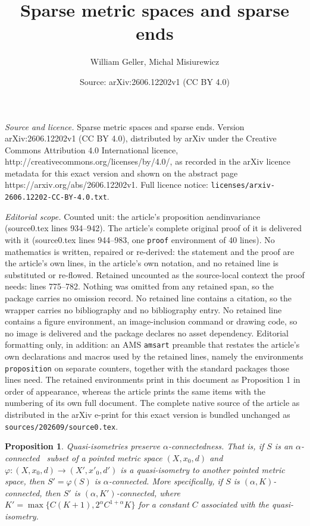 \documentclass[10pt,a4paper]{amsart}
\title{Sparse metric spaces and sparse ends}
\author{William Geller, Michal Misiurewicz}
\date{Source: arXiv:2606.12202v1 (CC BY 4.0)}
\newtheorem{proposition}{Proposition}
\newcommand{\aconn}{$\alpha$-connected}
\newcommand{\akconn}{$(\alpha,K)$-connected}
\newcommand{\akpconn}{$(\alpha,K')$-connected}
\newcommand{\ph}{\varphi}
\begin{document}
\maketitle

\noindent\emph{Source and licence.} Sparse metric spaces and sparse ends. Version arXiv:2606.12202v1 (CC BY 4.0), distributed by arXiv under the Creative Commons Attribution 4.0 International licence, http://creativecommons.org/licenses/by/4.0/, as recorded in the arXiv licence metadata for this exact version and shown on the abstract page https://arxiv.org/abs/2606.12202v1. Full licence notice: \texttt{licenses/arxiv-2606.12202-CC-BY-4.0.txt}.\par\smallskip

\noindent\textit{Editorial scope.} Counted unit: the article's proposition aendinvariance (source0.tex lines 934--942). The article's complete original proof of it is delivered with it (source0.tex lines 944--983, one \texttt{proof} environment of 40 lines). No mathematics is written, repaired or re-derived: the statement and the proof are the article's own lines, in the article's own notation, and no retained line is substituted or re-flowed.  Retained uncounted as the source-local context the proof needs: lines 775--782.  Nothing was omitted from any retained span, so the package carries no omission record.  No retained line contains a citation, so the wrapper carries no bibliography and no bibliography entry.  No retained line contains a figure environment, an image-inclusion command or drawing code, so no image is delivered and the package declares no asset dependency.  Editorial formatting only, in addition: an AMS \texttt{amsart} preamble that restates the article's own declarations and macros used by the retained lines, namely the environments \texttt{proposition} on separate counters, together with the standard packages those lines need.  The retained environments print in this document as Proposition 1 in order of appearance, whereas the article prints the same items with the numbering of its own full document.  The complete native source of the article as distributed in the arXiv e-print for this exact version is bundled unchanged as \texttt{sources/202609/source0.tex}.
\begin{proposition}\label{aconninvariance}
Quasi-isometries preserve \aconn ness. That is, if $S$ is an \aconn
\ subset of a pointed metric space $(X,x_0,d)$ and $\ph: (X,x_0,d) \to
(X',x'_0,d')$ is a quasi-isometry to another pointed metric space,
then $S'=\ph(S)$ is \aconn. More specifically, if $S$ is \akconn, then
$S'$ is \akpconn, where $K'=\max\{C(K+1), 2^\alpha C^{1+\alpha} K\}$
for a constant $C$ associated with the quasi-isometry.
\end{proposition}
\end{document}
